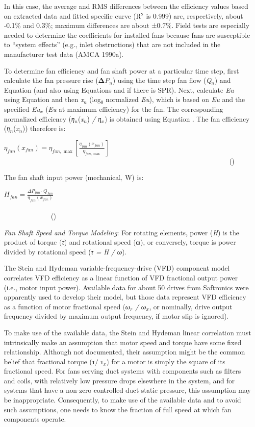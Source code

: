 In this case, the average and RMS differences between the efficiency values based on extracted data and fitted specific curve (R\(^{2}\) is 0.999) are, respectively, about -0.1\% and 0.3\%; maximum differences are about ±0.7\%. Field tests are especially needed to determine the coefficients for installed fans because fans are susceptible to ``system effects'' (e.g., inlet obstructions) that are not included in the manufacturer test data (AMCA 1990a).

To determine fan efficiency and fan shaft power at a particular time step, first calculate the fan pressure rise (\textbf{Δ}\emph{P\(_{n}\)}) using the time step fan flow (\emph{Q\(_{n}\)}) and Equation (and also using Equations and if there is SPR). Next, calculate \emph{Eu} using Equation and then \emph{x\(_{n}\)} (log\(_{0}\) normalized \emph{Eu}), which is based on \emph{Eu} and the specified \emph{Eu\(_{x}\)} (\emph{Eu} at maximum efficiency) for the fan. The corresponding normalized efficiency (\emph{η\(_{n}\)}(\emph{x\(_{n}\)}) \emph{/ η\(_{x}\)}) is obtained using Equation . The fan efficiency (\emph{η\(_{n}\)}(\emph{x\(_{n}\)})) therefore is:

\({\eta_{fan}}\left( {{x_{fan}}} \right) = {\eta_{fan,\max }}\left[ {\frac{{{\eta_{fan}}\left( {{x_{fan}}} \right)}}{{{\eta_{fan,\max }}}}} \right]\) ~~~~~~~~~~~~~~~~~~~~~~~~~~~~~~~~~~~~~~~~~~~~~~~~~~~~~~~~~~~~~~~~~ ()

The fan shaft input power (mechanical, W) is:

\({H_{fan}} = \frac{{\Delta {P_{fan}} \cdot {Q_{fan}}}}{{{\eta_{fan}}\left( {{x_{fan}}} \right)}}\) ~~~~~~~~~~~~~~~~~~~~~~~~~~~~~~~~~~~~~~~~~~~~~~~~~~~~~~~~~~~~~~~~~~~~~~~~~~~~~~~~~~~~~ ()

\emph{Fan Shaft Speed and Torque Modeling}: For rotating elements, power (\emph{H}) is the product of torque (\emph{τ}) and rotational speed (ω), or conversely, torque is power divided by rotational speed (\emph{τ = H / ω}).

The Stein and Hydeman variable-frequency-drive (VFD) component model correlates VFD efficiency as a linear function of VFD fractional output power (i.e., motor input power). Available data for about 50 drives from Saftronics were apparently used to develop their model, but those data represent VFD efficiency as a function of motor fractional speed (\emph{ω\(_{r}\) / ω\(_{x}\)}, or nominally, drive output frequency divided by maximum output frequency, if motor slip is ignored).

To make use of the available data, the Stein and Hydeman linear correlation must intrinsically make an assumption that motor speed and torque have some fixed relationship. Although not documented, their assumption might be the common belief that fractional torque (τ/ τ\(_{x}\)) for a motor is simply the square of its fractional speed. For fans serving duct systems with components such as filters and coils, with relatively low pressure drops elsewhere in the system, and for systems that have a non-zero controlled duct static pressure, this assumption may be inappropriate. Consequently, to make use of the available data and to avoid such assumptions, one needs to know the fraction of full speed at which fan components operate.

